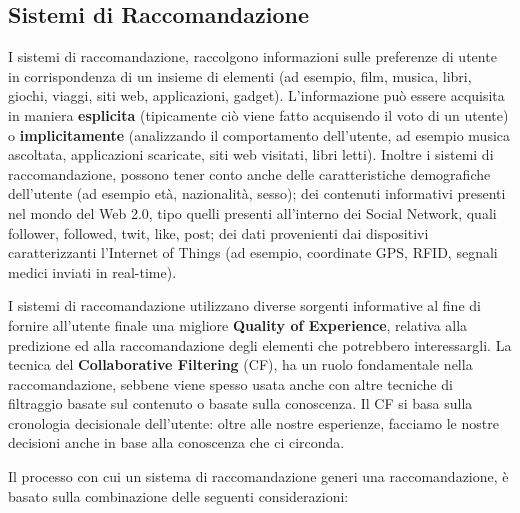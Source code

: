 \documentclass[12pt]{article}
\begin{document}
\subsection{Sistemi di Raccomandazione}
I sistemi di raccomandazione, raccolgono informazioni sulle preferenze di utente in corrispondenza di un insieme di elementi (ad esempio, film, musica, libri, giochi, viaggi, siti web, applicazioni, gadget). L'informazione può essere acquisita in maniera \textbf{esplicita} (tipicamente ciò viene fatto acquisendo il voto di un utente) o \textbf{implicitamente} (analizzando il comportamento dell'utente, ad esempio musica ascoltata, applicazioni scaricate, siti web visitati, libri letti). Inoltre i sistemi di raccomandazione, possono tener conto anche delle caratteristiche demografiche dell'utente (ad esempio età, nazionalità, sesso); dei contenuti informativi presenti nel mondo del Web 2.0, tipo quelli presenti all'interno dei Social Network, quali follower, followed, twit, like, post; dei dati provenienti dai dispositivi caratterizzanti l'Internet of Things (ad esempio, coordinate GPS, RFID, segnali medici inviati in real-time). 

I sistemi di raccomandazione utilizzano diverse sorgenti informative al fine di fornire all'utente finale una migliore \textbf{Quality of Experience}, relativa alla predizione ed alla raccomandazione degli elementi che potrebbero interessargli. La tecnica del \textbf{Collaborative Filtering} (CF), ha un ruolo fondamentale nella raccomandazione, sebbene viene spesso usata anche con altre tecniche di filtraggio basate sul contenuto o basate sulla conoscenza. Il CF si basa sulla cronologia decisionale dell'utente: oltre alle nostre esperienze, facciamo le nostre decisioni anche in base alla conoscenza che ci circonda.

Il processo con cui un sistema di raccomandazione generi una raccomandazione, è basato sulla combinazione delle seguenti considerazioni:
\end{document}
